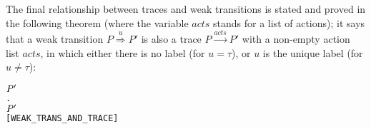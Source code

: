 The final relationship between traces and weak transitions is stated
and proved in the following theorem
(where the  variable $acts$ stands for
a list of actions); 
it says that a weak transition $P\overset{u}{\Rightarrow}P'$ is also a
trace $P\overset{acts}{\longrightarrow}P'$ with a
 non-empty action list $acts$, in which either there is no label (for $u = \tau$), or 
$u$ is the unique label (for $u \neq \tau$):
\begin{alltt}
\HOLTokenTurnstile{}  \HOLTokenWeakTransBegin{}\HOLTokenWeakTransEnd \ensuremath{\HOLFreeVar{P}\sp{\prime}} \HOLSymConst{\HOLTokenEquiv{}}
   \HOLSymConst{\HOLTokenExists{}}.
          \ensuremath{\HOLFreeVar{P}\sp{\prime}} \HOLSymConst{\HOLTokenConj{}} \HOLSymConst{\HOLTokenNeg{}}  \HOLSymConst{\HOLTokenConj{}}
         \HOLSymConst{\ensuremath{=}} \HOLSymConst{\ensuremath{\tau}}       \hfill{[WEAK_TRANS_AND_TRACE]}
\end{alltt}

